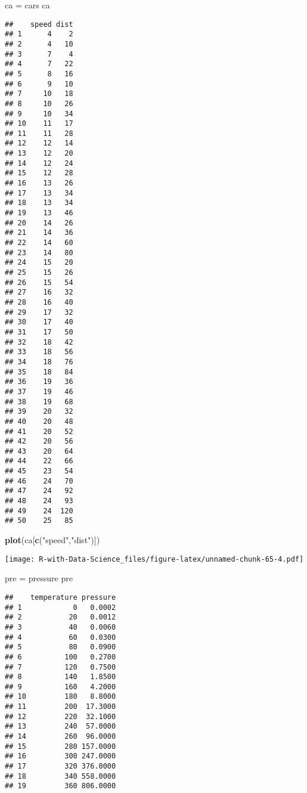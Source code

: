 \documentclass[
]{article}
\newenvironment{Shaded}{\begin{snugshade}}{\end{snugshade}}
\newcommand{\FunctionTok}[1]{\textcolor[rgb]{0.13,0.29,0.53}{\textbf{#1}}}
\newcommand{\NormalTok}[1]{#1}
\newcommand{\OtherTok}[1]{\textcolor[rgb]{0.56,0.35,0.01}{#1}}
\newcommand{\StringTok}[1]{\textcolor[rgb]{0.31,0.60,0.02}{#1}}
\begin{document}
\begin{Shaded}
\begin{Highlighting}[]
\NormalTok{ca }\OtherTok{=}\NormalTok{ cars}
\NormalTok{ca}
\end{Highlighting}
\end{Shaded}

\begin{verbatim}
##    speed dist
## 1      4    2
## 2      4   10
## 3      7    4
## 4      7   22
## 5      8   16
## 6      9   10
## 7     10   18
## 8     10   26
## 9     10   34
## 10    11   17
## 11    11   28
## 12    12   14
## 13    12   20
## 14    12   24
## 15    12   28
## 16    13   26
## 17    13   34
## 18    13   34
## 19    13   46
## 20    14   26
## 21    14   36
## 22    14   60
## 23    14   80
## 24    15   20
## 25    15   26
## 26    15   54
## 27    16   32
## 28    16   40
## 29    17   32
## 30    17   40
## 31    17   50
## 32    18   42
## 33    18   56
## 34    18   76
## 35    18   84
## 36    19   36
## 37    19   46
## 38    19   68
## 39    20   32
## 40    20   48
## 41    20   52
## 42    20   56
## 43    20   64
## 44    22   66
## 45    23   54
## 46    24   70
## 47    24   92
## 48    24   93
## 49    24  120
## 50    25   85
\end{verbatim}

\begin{Shaded}
\begin{Highlighting}[]
\FunctionTok{plot}\NormalTok{(ca[}\FunctionTok{c}\NormalTok{(}\StringTok{"speed"}\NormalTok{,}\StringTok{"dist"}\NormalTok{)])}
\end{Highlighting}
\end{Shaded}

\texttt{[image: R-with-Data-Science\_files/figure-latex/unnamed-chunk-65-4.pdf]}

\begin{Shaded}
\begin{Highlighting}[]
\NormalTok{pre }\OtherTok{=}\NormalTok{ pressure}
\NormalTok{pre}
\end{Highlighting}
\end{Shaded}

\begin{verbatim}
##    temperature pressure
## 1            0   0.0002
## 2           20   0.0012
## 3           40   0.0060
## 4           60   0.0300
## 5           80   0.0900
## 6          100   0.2700
## 7          120   0.7500
## 8          140   1.8500
## 9          160   4.2000
## 10         180   8.8000
## 11         200  17.3000
## 12         220  32.1000
## 13         240  57.0000
## 14         260  96.0000
## 15         280 157.0000
## 16         300 247.0000
## 17         320 376.0000
## 18         340 558.0000
## 19         360 806.0000
\end{verbatim}
\end{document}
